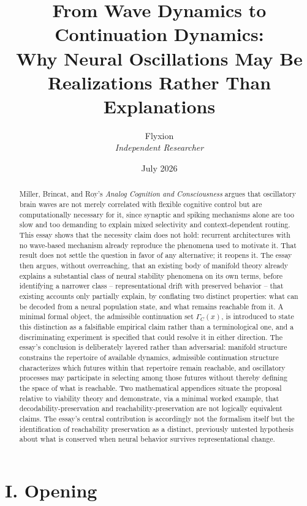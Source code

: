 \documentclass[11pt]{article}
\title{\textbf{From Wave Dynamics to Continuation Dynamics:\\ Why Neural Oscillations May Be Realizations Rather Than Explanations}}
\author{Flyxion \\ \textit{Independent Researcher}}
\date{July 2026}
\begin{document}
\maketitle

\begin{abstract}
\noindent Miller, Brincat, and Roy's \textit{Analog Cognition and Consciousness} argues that oscillatory brain waves are not merely correlated with flexible cognitive control but are computationally necessary for it, since synaptic and spiking mechanisms alone are too slow and too demanding to explain mixed selectivity and context-dependent routing. This essay shows that the necessity claim does not hold: recurrent architectures with no wave-based mechanism already reproduce the phenomena used to motivate it. That result does not settle the question in favor of any alternative; it reopens it. The essay then argues, without overreaching, that an existing body of manifold theory already explains a substantial class of neural stability phenomena on its own terms, before identifying a narrower class -- representational drift with preserved behavior -- that existing accounts only partially explain, by conflating two distinct properties: what can be decoded from a neural population state, and what remains reachable from it. A minimal formal object, the admissible continuation set $\Gamma_C(x)$, is introduced to state this distinction as a falsifiable empirical claim rather than a terminological one, and a discriminating experiment is specified that could resolve it in either direction. The essay's conclusion is deliberately layered rather than adversarial: manifold structure constrains the repertoire of available dynamics, admissible continuation structure characterizes which futures within that repertoire remain reachable, and oscillatory processes may participate in selecting among those futures without thereby defining the space of what is reachable. Two mathematical appendices situate the proposal relative to viability theory and demonstrate, via a minimal worked example, that decodability-preservation and reachability-preservation are not logically equivalent claims. The essay's central contribution is accordingly not the formalism itself but the identification of reachability preservation as a distinct, previously untested hypothesis about what is conserved when neural behavior survives representational change.
\end{abstract}

\newpage

\section*{I. Opening}
\end{document}
